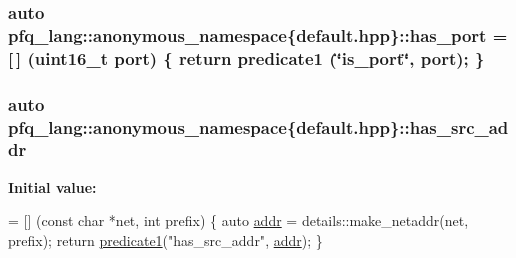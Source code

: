 \hypertarget{namespacepfq__lang_1_1anonymous__namespace_02default_8hpp_03_ad2840696177c5f4f6f2072bcaae7407e}{
\subsubsection[{has\-\_\-port}]{\setlength{\rightskip}{0pt plus 5cm}auto pfq\-\_\-lang\-::anonymous\-\_\-namespace\{default.\-hpp\}\-::has\-\_\-port = \mbox{[}$\,$\mbox{]} (uint16\-\_\-t {\bf port}) \{ return {\bf predicate1} (\char`\"{}is\-\_\-port\char`\"{}, port); \}}}\label{namespacepfq__lang_1_1anonymous__namespace_02default_8hpp_03_ad2840696177c5f4f6f2072bcaae7407e}
\hypertarget{namespacepfq__lang_1_1anonymous__namespace_02default_8hpp_03_aabc75799de679df702f4179ead82114c}{
\subsubsection[{has\-\_\-src\-\_\-addr}]{\setlength{\rightskip}{0pt plus 5cm}auto pfq\-\_\-lang\-::anonymous\-\_\-namespace\{default.\-hpp\}\-::has\-\_\-src\-\_\-addr}}\label{namespacepfq__lang_1_1anonymous__namespace_02default_8hpp_03_aabc75799de679df702f4179ead82114c}
{\bfseries Initial value\-:}
\begin{DoxyCode}
= [] (\textcolor{keyword}{const} \textcolor{keywordtype}{char} *net, \textcolor{keywordtype}{int} prefix)
        \{
            \textcolor{keyword}{auto} \hyperlink{namespacepfq__lang_1_1anonymous__namespace_02default_8hpp_03_aafce8334d1be83bff9a2115439c8c453}{addr} = details::make\_netaddr(net, prefix);
            \textcolor{keywordflow}{return} \hyperlink{namespacepfq__lang_ae23a03cee94b5ddfde4a8d2e5c521f0e}{predicate1}(\textcolor{stringliteral}{"has\_src\_addr"}, \hyperlink{namespacepfq__lang_1_1anonymous__namespace_02default_8hpp_03_aafce8334d1be83bff9a2115439c8c453}{addr});
        \}
\end{DoxyCode}

